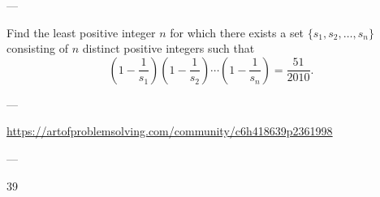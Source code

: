 
---

Find the least positive integer $n$ for which there exists a set $\{s_1,s_2,\ldots,s_n\}$ consisting of $n$ distinct positive integers such that \[\left(1-\frac 1{s_1}\right)\left(1-\frac 1{s_2}\right)\cdots\left(1-\frac 1{s_n}\right)=\frac{51}{2010}.\]

---

\url{https://artofproblemsolving.com/community/c6h418639p2361998}

---

39
